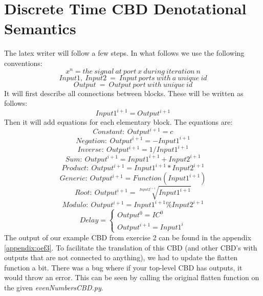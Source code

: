 \documentclass{article}
\begin{document}
\section{Discrete Time CBD Denotational Semantics}
The latex writer will follow a few steps. In what follows we use the following conventions:
\[x^{n} = the\ signal\ at\ port\ x\ during\ iteration\ n\]
\[Input1,\ Input2\ =\ Input\ ports\ with\ a\ unique\ id\]
\[Output\ =\ Output\ port\ with\ unique\ id\]
 It will first describe all connections between blocks. These will be written as follows:
\[Input1^{i+1} = Output^{i+1}\]
Then it will add equations for each elementary block. The equations are:
\[Constant:\ Output^{i+1} = c\]
\[Negation:\ Output^{i+1} = -Input1^{i+1}\]
\[Inverse:\ Output^{i+1} = 1/Input1^{i+1}\]
\[Sum:\ Output^{i+1}=Input1^{i+1}+Input2^{i+1}\]
\[Product:\ Output^{i+1}=Input1^{i+1}*Input2^{i+1}\]
\[Generic:\ Output^{i+1}=Function(Input1^{i+1})\]
\[Root:\ Output^{i+1}=\sqrt[Input2^{i+1}]{Input1^{i+1}}\]
\[Modulo:\ Output^{i+1}=Input1^{i+1}\%Input2^{i+1}\]
\[
 Delay = 
  \begin{cases} 
    Output^{0} = IC^{0}\\
    Output^{i+1} = Input1^{i}
  \end{cases}
\]
The output of our example CBD from exercise 2 can be found in the appendix \ref{appendix:oef3}. To facilitate the translation of this CBD (and other CBD's with outputs that are not connected to anything), we had to update the flatten function a bit. There was a bug where if your top-level CBD has outputs, it would throw an error. This can be seen by calling the original flatten function on the given \textit{evenNumbersCBD.py}.
\newpage
\end{document}
